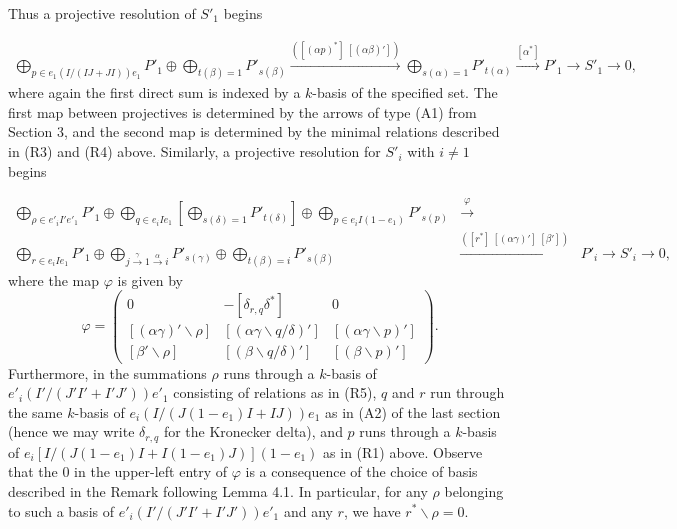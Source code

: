 \documentclass{amsart}
\begin{document}
Thus a projective resolution of $S'_1$ begins 

\begin{eqnarray}
 \bigoplus_{p \in e_1(I/(IJ+JI))e_1} P'_1 \oplus \bigoplus_{t(\beta)=1} P'_{s(\beta)} \stackrel{\left( [(\alpha p)^*]\ [(\alpha \beta)'] \right)}{\longrightarrow} \bigoplus_{s(\alpha)=1} P'_{t(\alpha)} \stackrel{[\alpha^*]}{\longrightarrow} P'_1 \longrightarrow S'_1 \rightarrow 0,
\end{eqnarray}
where again the first direct sum is indexed by a $k$-basis of the specified set.  The first map between projectives is determined by the arrows of type (A1) from Section 3, and the second map is determined by the minimal relations described in (R3) and (R4) above.  Similarly, a projective resolution for $S'_i$ with $i \neq 1$ begins

\begin{eqnarray}
 \bigoplus_{\rho \in e'_iI'e'_1} P'_1 \oplus \bigoplus_{q \in e_iIe_1} \left[ \bigoplus_{s(\delta)=1} P'_{t(\delta)} \right] \oplus \bigoplus_{p \in e_iI(1-e_1)} P'_{s(p)} & \stackrel{\varphi}{\longrightarrow} & \nonumber \\ \bigoplus_{r \in e_iIe_1} P'_1 \oplus \bigoplus_{j \stackrel{\gamma}{\rightarrow} 1 \stackrel{\alpha}{\rightarrow} i} P'_{s(\gamma)} \oplus \bigoplus_{t(\beta)=i} P'_{s(\beta)} & \stackrel{\left( [r^*]\ [(\alpha \gamma)']\ [\beta'] \right)}{\longrightarrow} & P'_i \longrightarrow S'_i \rightarrow 0,
\end{eqnarray}
where the map $\varphi$ is given by
 $$\varphi =  \left( \begin{array}{ccc} 0 & -[\delta_{r,q} \delta^*] & 0\\  \left[(\alpha \gamma)' \backslash \rho \right] &  \left[(\alpha \gamma \backslash q/ \delta)'\right] & \left[(\alpha \gamma \backslash p)'\right] \\ \left[\beta' \backslash \rho \right] & \left[ (\beta \backslash q/ \delta)' \right] & \left[ (\beta \backslash p)' \right] \end{array} \right) .$$
Furthermore, in the summations $\rho$ runs through a $k$-basis of $e'_i( I'/(J'I'+I'J')) e'_1$ consisting of relations as in (R5), $q$ and $r$ run through the same $k$-basis of $e_i(I/(J(1-e_1)I +IJ))e_1$ as in (A2) of the last section (hence we may write $\delta_{r,q}$ for the Kronecker delta), and $p$ runs through a $k$-basis of $e_i[I / (J(1-e_1)I + I(1-e_1)J)](1-e_1)$ as in (R1) above.  Observe that the $0$ in the upper-left entry of $\varphi$ is a consequence of the choice of basis described in the Remark following Lemma 4.1.  In particular, for any $\rho$ belonging to such a basis of $e'_i(I'/(J'I'+I'J'))e'_1$ and any $r$, we have $r^* \backslash \rho = 0$.
\end{document}

